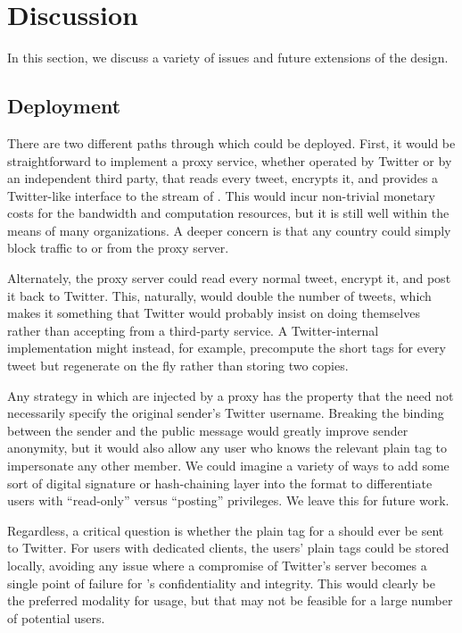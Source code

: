 \section{Discussion} \label{sec:discuss}

In this section, we discuss a variety of issues and future extensions of the \hoot design.

\subsection{Deployment}

There are two different paths through which \hoot could be deployed. First, it would be straightforward to implement a proxy service, whether operated by Twitter or by an independent third party, that reads every tweet, encrypts it, and provides a Twitter-like interface to the stream of \msgs. This would incur non-trivial monetary costs for the bandwidth and computation resources, but it is still well within the means of many organizations. A deeper concern is that any country could simply block traffic to or from the \hoot proxy server.

Alternately, the proxy server could read every normal tweet, encrypt it, and post it back to Twitter. This, naturally, would double the number of tweets, which makes it something that Twitter would probably insist on doing themselves rather than accepting from a third-party service. A Twitter-internal implementation might instead, for example, precompute the short tags for every tweet but regenerate \msgs on the fly rather than storing two copies.

Any strategy in which \msgs are injected by a proxy has the property that the \msg need not necessarily specify the original sender's Twitter username.  Breaking the binding between the sender and the public \hoot message would greatly improve sender anonymity, but it would also allow any user who knows the relevant plain tag to impersonate any other member. We could imagine a variety of ways to add some sort of digital signature or hash-chaining layer into the \msg format to differentiate users with ``read-only'' versus ``posting'' privileges. We leave this for future work.

Regardless, a critical question is whether the plain tag for a \msg should ever be sent to Twitter. For users with dedicated clients, the users' plain tags could be stored locally, avoiding any issue where a compromise of Twitter's server becomes a single point of failure for \hoot's confidentiality and integrity. This would clearly be the preferred modality for \hoot usage, but that may not be feasible for a large number of potential \hoot users.

